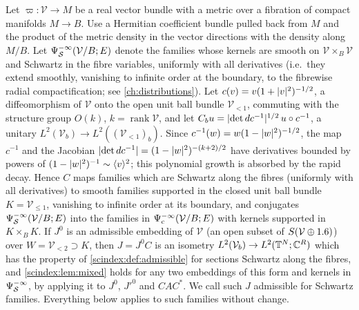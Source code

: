 \begin{remark}\label{scindex:rem:schwartz}
  Let $\varpi:\mathcal V\to M$ be a real vector bundle with a metric over a
  fibration of compact manifolds $M\to B$. Use a Hermitian coefficient
  bundle pulled back from $M$ and the product of the metric density in
  the vector directions with the density along $M/B$.
  Let $\Psi^{-\infty}_{\mathcal S}
  (\mathcal V/B;E)$ denote the families whose kernels are smooth on
  $\mathcal V\times_B\mathcal V$ and Schwartz in the fibre variables, uniformly
  with all derivatives (i.e.\ they extend smoothly, vanishing to infinite order at
  the boundary, to the fibrewise radial compactification; see
  \cref{ch:distributions}). Let $c(v)=v(1+\lvert v\rvert^2)^{-1/2}$, a diffeomorphism
  of $\mathcal V$ onto the open unit ball bundle $\mathcal V_{<1}$, commuting with
  the structure group $O(k)$, $k=\operatorname{rank}\mathcal V$, and let $C_bu=\lvert \det dc^{-1}\rvert^{1/2}\,u\circ
  c^{-1}$, a unitary $L^2(\mathcal V_b)\to L^2((\mathcal V_{<1})_b)$. Since
  $c^{-1}(w)=w(1-\lvert w\rvert^2)^{-1/2}$, the map $c^{-1}$ and the Jacobian
  $\lvert \det dc^{-1}\rvert=(1-\lvert w\rvert^2)^{-(k+2)/2}$ have derivatives bounded by powers of
  $(1-\lvert w\rvert^2)^{-1}\sim\langle v\rangle^2$; this polynomial growth is absorbed by the rapid
  decay. Hence $C$ maps families which are Schwartz along the fibres (uniformly
  with all derivatives) to smooth families supported in the closed unit ball
  bundle $K=\mathcal V_{\le1}$, vanishing to infinite order at its boundary, and
  conjugates $\Psi^{-\infty}_{\mathcal S}(\mathcal V/B;E)$ into the families in
  $\Psi^{-\infty}_{\mathrm c}(\mathcal V/B;E)$ with kernels supported in
  $K\times_BK$. If $J^0$ is an admissible embedding of $\mathcal V$ (an open
  subset of $S(\mathcal V\oplus1.6)$) over $W=\mathcal V_{<2}\supset K$, then
  $J=J^0C$ is an isometry $L^2(\mathcal V_b)\to L^2(\mathbb{T}^N;\mathbb{C}^R)$ which has the
  property of \cref{scindex:def:admissible} for sections Schwartz along the
  fibres, and \cref{scindex:lem:mixed} holds for any two embeddings of this form
  and kernels in $\Psi^{-\infty}_{\mathcal S}$, by applying it to $J^0$, $J'^0$
  and $CAC^*$. We call such $J$ admissible for Schwartz families. Everything
  below applies to such families without change.
\end{remark}

